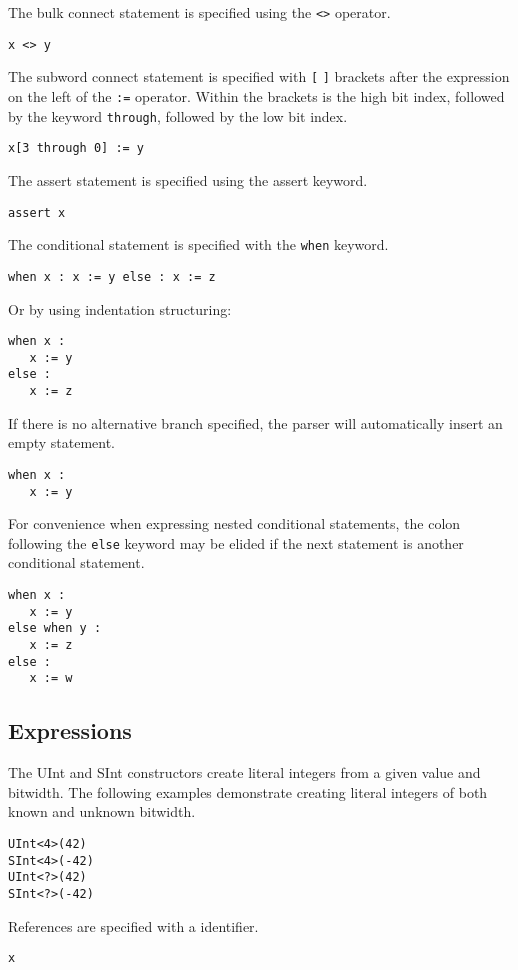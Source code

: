\documentclass[12pt]{article}
\begin{document}
The bulk connect statement is specified using the \verb|<>| operator.
\begin{verbatim}
x <> y 
\end{verbatim}

The subword connect statement is specified with \verb|[| \verb|]| brackets after the expression on the left of the \verb|:=| operator. Within the brackets is the high bit index, followed by the keyword \verb|through|, followed by the low bit index.
\begin{verbatim}
x[3 through 0] := y 
\end{verbatim}

The assert statement is specified using the assert keyword.
\begin{verbatim}
assert x
\end{verbatim}

The conditional statement is specified with the \verb|when| keyword.
\begin{verbatim}
when x : x := y else : x := z
\end{verbatim}
Or by using indentation structuring:
\begin{verbatim}
when x :
   x := y
else :
   x := z
\end{verbatim}

If there is no alternative branch specified, the parser will automatically insert an empty statement.
\begin{verbatim}
when x :
   x := y
\end{verbatim}

For convenience when expressing nested conditional statements, the colon following the \verb|else| keyword may be elided if the next statement is another conditional statement.
\begin{verbatim}
when x :
   x := y
else when y :
   x := z
else :
   x := w
\end{verbatim}

\subsection*{Expressions}

The UInt and SInt constructors create literal integers from a given value and bitwidth.
The following examples demonstrate creating literal integers of both known and unknown bitwidth.
\begin{verbatim}
UInt<4>(42)
SInt<4>(-42)
UInt<?>(42)
SInt<?>(-42)
\end{verbatim}

References are specified with a identifier.
\begin{verbatim}
x
\end{verbatim}
\end{document}
